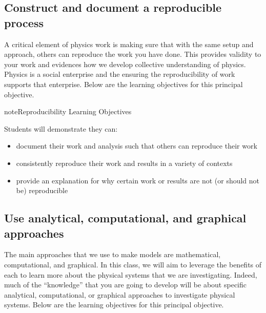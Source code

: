 \documentclass[letterpaper,10pt,english]{jupyterBook}
\begin{document}
\subsection{Construct and document a reproducible process}
\label{\detokenize{content/0_course/goals:construct-and-document-a-reproducible-process}}
\sphinxAtStartPar
A critical element of physics work is making sure that with the same setup and approach, others can reproduce the work you have done. This provides validity to your work and evidences how we develop collective understanding of physics. Physics is a social enterprise and the ensuring the reproducibility of work supports that enterprise. Below are the learning objectives for this principal objective.

\begin{sphinxadmonition}{note}{Reproducibility Learning Objectives}

\sphinxAtStartPar
Students will demonstrate they can:
\begin{itemize}
\item {} 
\sphinxAtStartPar
document their work and analysis such that others can reproduce their work

\item {} 
\sphinxAtStartPar
consistently reproduce their work and results in a variety of contexts

\item {} 
\sphinxAtStartPar
provide an explanation for why certain work or results are not (or should not be) reproducible

\end{itemize}
\end{sphinxadmonition}


\subsection{Use analytical, computational, and graphical approaches}
\label{\detokenize{content/0_course/goals:use-analytical-computational-and-graphical-approaches}}
\sphinxAtStartPar
The main approaches that we use to make models are mathematical, computational, and graphical. In this class, we will aim to leverage the benefits of each to learn more about the physical systems that we are investigating. Indeed, much of the “knowledge” that you are going to develop will be about specific analytical, computational, or graphical approaches to investigate physical systems. Below are the learning objectives for this principal objective.
\end{document}
